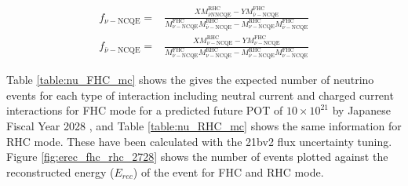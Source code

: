 \begin{equation}
    \begin{aligned}
    f_{\nu-\mathrm{NCQE}}= & \frac{X M_{\bar{\nu} \mathrm{N} \mathrm{NCQE}}^{\mathrm{RHC}}-Y M_{\bar{\nu}-\mathrm{NCQE}}^{\mathrm{FHC}}}{M_{\nu-\mathrm{NCQE}}^{\mathrm{FHC}} M_{\bar{\nu}-\mathrm{NCQE}}^{\mathrm{RHC}}-M_{\nu-\mathrm{NCQE}}^{\mathrm{RHC}} M_{\bar{\nu}-\mathrm{NCQE}}^{\mathrm{FHC}}} \\
    f_{\bar{\nu}-\mathrm{NCQE}}= & \frac{X M_{\nu-\mathrm{NCQE}}^{\mathrm{RHC}}-Y M_{\nu-\mathrm{NCQE}}^{\mathrm{FHC}}}{M_{\bar{\nu}-\mathrm{NCQE}}^{\mathrm{FHC}} M_{\nu-\mathrm{NCQE}}^{\mathrm{RHC}}-M_{\bar{\nu}-\mathrm{NCQE}}^{\mathrm{RHC}} M_{\nu-\mathrm{NCQE}}^{\mathrm{FHC}}}
    \end{aligned}
\label{eq:scale_factor_nu}
\end{equation}


Table \ref{table:nu_FHC_mc} shows the gives the expected number of neutrino events for each type of interaction including neutral current and charged current interactions for FHC mode for a predicted future POT of $10 \times 10^{21}$ by Japanese Fiscal Year 2028 \cite{Abe:2016tii}, and Table \ref{table:nu_RHC_mc} shows the same information for RHC mode. These have been calculated with the 21bv2 flux uncertainty tuning. Figure \ref{fig:erec_fhc_rhc_2728} shows the number of events plotted against the reconstructed energy ($E_{rec}$) of the event for FHC and RHC mode.

